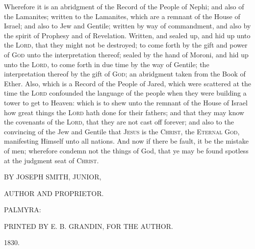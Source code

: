 		Wherefore it is an abridgment of the Record of the People of Nephi; and also of the Lamanites; written to the Lamanites, which are a remnant of the House of Israel; and also to Jew and Gentile; written by way of commandment, and also by the spirit of Prophesy and of Revelation. Written, and sealed up, and hid up unto the L\textsc{ord}, that they might not be destroyed; to come forth by the gift and power of G\textsc{od} unto the interpretation thereof; sealed by the hand of Moroni, and hid up unto the L\textsc{ord}, to come forth in due time by the way of Gentile; the interpretation thereof by the gift of G\textsc{od}; an abridgment taken from the Book of Ether.
		Also, which is a Record of the People of Jared, which were scattered at the time the L\textsc{ord} confounded the language of the people when they were building a tower to get to Heaven: which is to shew unto the remnant of the House of Israel how great things the L\textsc{ord} hath done for their fathers; and that they may know the covenants of the L\textsc{ord}, that they are not cast off forever; and also to the convincing of the Jew and Gentile that J\textsc{esus} is the C\textsc{hrist}, the E\textsc{ternal} G\textsc{od}, manifesting Himself unto all nations. And now if there be fault, it be the mistake of men; wherefore condemn not the things of God, that ye may be found spotless at the judgment seat of C\textsc{hrist}.

		\begin{tightcenter}
			BY JOSEPH SMITH, JUNIOR,
			
			AUTHOR AND PROPRIETOR.
			 
			PALMYRA:
			
			PRINTED BY E. B. GRANDIN, FOR THE AUTHOR.
			
			1830.
		\end{tightcenter}